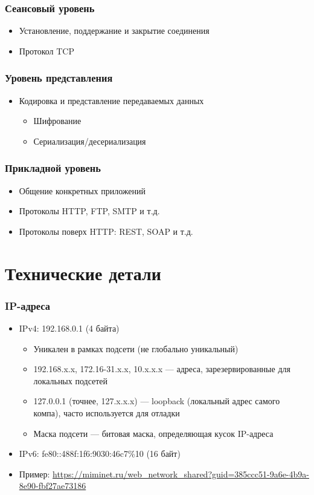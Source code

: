 \documentclass{../../slides-style}
\begin{document}
    \begin{frame}
        \frametitle{Сеансовый уровень}
        \begin{itemize}
            \item Установление, поддержание и закрытие соединения
            \item Протокол TCP
        \end{itemize}
    \end{frame}

    \begin{frame}
        \frametitle{Уровень представления}
        \begin{itemize}
            \item Кодировка и представление передаваемых данных
            \begin{itemize}
                \item Шифрование
                \item Сериализация/десериализация
            \end{itemize}
        \end{itemize}
    \end{frame}

    \begin{frame}
        \frametitle{Прикладной уровень}
        \begin{itemize}
            \item Общение конкретных приложений
            \item Протоколы HTTP, FTP, SMTP и т.д.
            \item Протоколы поверх HTTP: REST, SOAP и т.д.
        \end{itemize}
    \end{frame}

    \section{Технические детали}

    \begin{frame}
        \frametitle{IP-адреса}
        \begin{itemize}
            \item IPv4: 192.168.0.1 (4 байта)
            \begin{itemize}
                \item Уникален в рамках подсети (не глобально уникальный)
                \item 192.168.x.x, 172.16-31.x.x, 10.x.x.x --- адреса, зарезервированные для локальных подсетей
                \item 127.0.0.1 (точнее, 127.x.x.x) --- loopback (локальный адрес самого компа), часто используется для отладки
                \item Маска подсети --- битовая маска, определяющая кусок IP-адреса
            \end{itemize}
            \item IPv6: fe80::488f:1f6:9030:46c7\%10 (16 байт)
            \item Пример: \url{https://miminet.ru/web_network_shared?guid=385ccc51-9a6e-4b9a-8e90-fbf27ae73186}
        \end{itemize}
    \end{frame}
\end{document}

